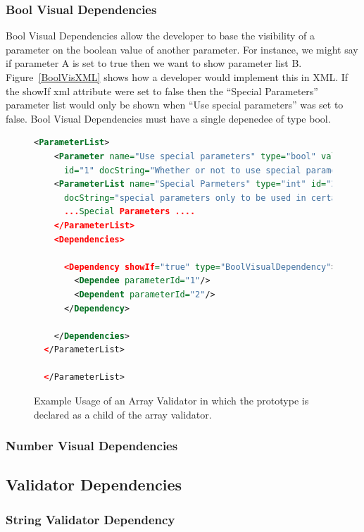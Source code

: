 \subsubsection{Bool Visual Dependencies}
Bool Visual Dependencies allow the developer to base the visibility of a parameter on the boolean value of another parameter. For instance, we might say
if parameter A is set to true then we want to show parameter list B. Figure~\ref{BoolVisXML} shows how a developer would implement this in XML. If the
showIf xml attribute were set to false then the ``Special Parameters'' parameter list would only be shown when ``Use special parameters'' was set to false.
Bool Visual Dependencies must have a single depenedee of type bool.
\begin{figure}
  \centering
  \begin{lstlisting}[language=XML]
  <ParameterList>
    <Parameter name="Use special parameters" type="bool" value="true"
      id="1" docString="Whether or not to use special parameters"/>
    <ParameterList name="Special Parmeters" type="int" id="2"
      docString="special parameters only to be used in certain instances" 
      ...Special Parameters ....
    </ParameterList>
    <Dependencies>

      <Dependency showIf="true" type="BoolVisualDependency">
        <Dependee parameterId="1"/>
        <Dependent parameterId="2"/>
      </Dependency>

    </Dependencies>
  </ParameterList>
        
  </ParameterList>
  \end{lstlisting}
  \caption{Example Usage of an Array Validator in which the prototype is declared as a child of the array validator.}
  \label{actualArrayValidatorXML}
\end{figure}



\subsubsection{Number Visual Dependencies}


\subsection{Validator Dependencies}

\subsubsection{String Validator Dependency}

